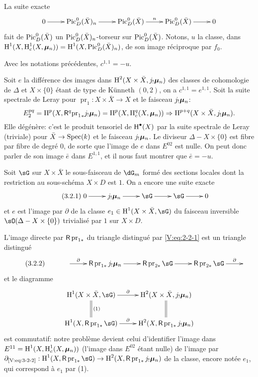 La suite exacte 
\[\xymatrix{
  0 \ar[r] 
    & \pic_D^0(\bar X)_n \ar[r] 
    & \pic_D^0(\bar X) \ar[r]^n 
    & \pic_D^0(\bar X) \ar[r] 
    & 0 
}\]
fait de $\operatorname{Pic}_D^0(\bar X)$ un $\operatorname{Pic}_D^0(\bar X)_n$-torseur sur 
$\operatorname{Pic}_D^0(\bar X)$. Notons, $u$ la classe, dans 
$\operatorname{H}^1(X,\operatorname{H}_c^1(X,{\bm\mu}_n))=\operatorname{H}^1(X,\operatorname{Pic}_D^0(\bar X)_n)$, de son image 
r\'eciproque par $f_0$. 





\begin{proposition_}\label{V:3-2}
Avec les notations pr\'ec\'edentes, $c^{1,1}=-u$.
\end{proposition_}

Soit $e$ la diff\'erence des images dans $\operatorname{H}^2(X\times \bar X,j_!{\bm\mu}_n)$ des 
classes de cohomologie de $\Delta$ et $X\times\{0\}$ \'etant de type de 
K\"unneth $(0,2)$, on a $c^{1,1}=e^{1,1}$. Soit la suite spectrale de Leray 
pour $\operatorname{pr}_1:X\times \bar X\to X$ et le faisceau $j_!{\bm\mu}_n$: 
\[
  E_2^{pq} = \operatorname{H}^p(X,\mathsf{R}^q {\operatorname{pr}_1}_\ast j_!{\bm\mu}_n) = \operatorname{H}^p(X,\operatorname{H}_c^q(X,{\bm\mu}_n)) \Rightarrow \operatorname{H}^{p+q}(X\times \bar X,j_!{\bm\mu}_n) \text{.}
\]
Elle d\'eg\'en\`ere: c'est le produit tensoriel de $\operatorname{H}^\bullet(X)$ par la 
suite spectrale de Leray (triviale) pour $\bar X\to \operatorname{Spec}(k)$ et le faisceau 
$j_!{\bm\mu}_n$. Le diviseur $\Delta-X\times\{0\}$ est fibre par fibre de degr\'e 
$0$, de sorte que l'image de $e$ dans $E^{02}$ est nulle. On peut donc parler 
de son image $\bar e$ dans $E^{1,1}$, et il nous faut montrer que 
$\bar e = -u$. 

Soit $\sG$ sur $X\times\bar X$ le sous-faisceau de $\dG_m$ form\'e des sections 
locales dont la restriction au sous-sch\'ema $X\times D$ est $1$. On a encore 
une suite exacte 
\begin{equation*}\tag{3.2.1}\label{V:eq:3-2-1}
\xymatrix{
  0 \ar[r] 
    & j_!\dmu_n \ar[r] 
    & \sG \ar[r] 
    & \sG \ar[r] 
    & 0 
}
\end{equation*}
et $e$ est l'image par $\partial$ de la classe $e_1\in \h^1(X\times\bar X,\sG)$ 
du faisceau inversible $\sO(\Delta-X\times\{0\})$ trivialis\'e par $1$ sur 
$X\times D$. 

L'image directe par $\mathsf{R}\operatorname{pr}_{1\ast}$ du triangle distingu\'e par 
\eqref{V:eq:2-2-1} est un triangle distingu\'e 
\begin{equation*}\tag{3.2.2}\label{V:eq:3-2-2}
\xymatrix{
  & \ar[r]^-\partial 
    & \R \operatorname{pr}_{1\ast} j_!\dmu_n \ar[r] 
    & \R \operatorname{pr}_{2\ast}\sG \ar[r] 
    & \R \operatorname{pr}_{2\ast}\sG \ar[r]^-\partial 
    & 
}
\end{equation*}
et le diagramme 
\[\xymatrix{
  \h^1(X\times \bar X,\sG) \ar[r]^-\partial \ar@{=}[d]^-{(1)} 
    & \h^2(X\times \bar X,j_!\dmu_n) \ar@{=}[d] \\
  \h^1(X,\R\operatorname{pr}_{1\ast} \sG) \ar[r]^-\partial 
    & \h^2(X,\R\operatorname{pr}_{1\ast} j_!\dmu_n) 
}\]
est commutatif: notre probl\`eme devient celui d'identifier l'image dans 
$E^{11}=\operatorname{H}^1(X,\operatorname{H}_c^1(X,{\bm\mu}_n))$ (l'image dans $E^{02}$ \'etant nulle) de 
l'image par 
$\partial_{\text{\eqref{V:eq:3-2-2}}}:\h^1(X,\R\operatorname{pr}_{1\ast}\sG) \to \h^2(X,\R\operatorname{pr}_{1\ast} j_!\dmu_n)$ 
de la classe, encore not\'ee $e_1$, qui correspond \`a $e_1$ par 
(1). 

